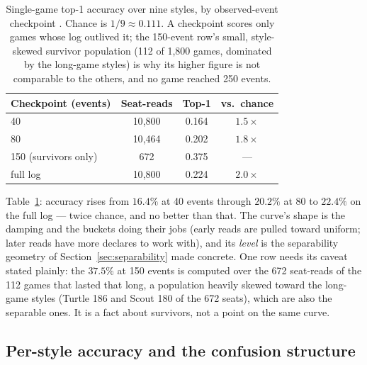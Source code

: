 \documentclass[11pt]{article}
\begin{document}
\begin{table}[t]
\centering
\caption{Single-game top-1 accuracy over nine styles, by observed-event checkpoint
\cite{artifact}. Chance is $1/9 \approx 0.111$. A checkpoint scores only games whose log
outlived it; the 150-event row's small, style-skewed survivor population (112 of 1{,}800
games, dominated by the long-game styles) is why its higher figure is not comparable to the
others, and no game reached 250 events.}
\label{tab:curve}
\small
\begin{tabular}{@{}lccc@{}}
\toprule
Checkpoint (events) & Seat-reads & Top-1 & vs.\ chance \\
\midrule
40         & 10{,}800 & 0.164 & $1.5\times$ \\
80         & 10{,}464 & 0.202 & $1.8\times$ \\
150 (survivors only) & 672 & 0.375 & --- \\
full log   & 10{,}800 & 0.224 & $2.0\times$ \\
\bottomrule
\end{tabular}
\end{table}

Table~\ref{tab:curve}: accuracy rises from $16.4\%$ at 40 events through $20.2\%$ at 80 to
$22.4\%$ on the full log --- twice chance, and no better than that. The curve's shape is the
damping and the buckets doing their jobs (early reads are pulled toward uniform; later reads
have more declares to work with), and its \emph{level} is the separability geometry of
Section~\ref{sec:separability} made concrete. One row needs its caveat stated plainly: the
$37.5\%$ at 150 events is computed over the 672 seat-reads of the 112 games that lasted that
long, a population heavily skewed toward the long-game styles (Turtle 186 and Scout 180 of
the 672 seats), which are also the separable ones. It is a fact about survivors, not a point
on the same curve.

\subsection{Per-style accuracy and the confusion structure}
\end{document}
